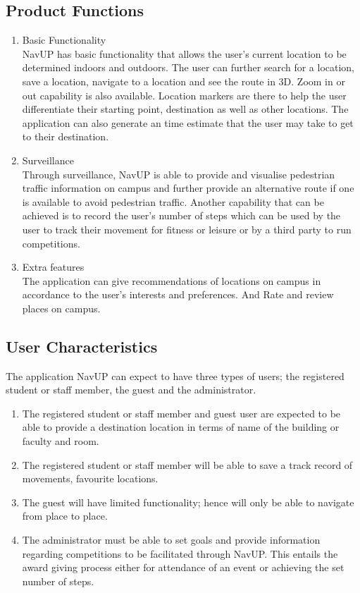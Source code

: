 \documentclass[a4paper,10pt]{article}
\begin{document}
	\subsection{Product Functions}
		\begin{enumerate}
			\item Basic Functionality\\
			NavUP has basic functionality that allows the user's current location to be determined indoors and outdoors. The user can further search for a location, save a location, navigate to a location and see the route in 3D. Zoom in or out capability is also available. Location markers  are there to help the user differentiate their starting point, destination as well as other locations. The application can also generate an time estimate that the user may take to get to their destination.
			
			\item Surveillance\\
			Through surveillance, NavUP is able to provide and visualise pedestrian traffic information on campus and further provide an alternative route if one is available to avoid pedestrian traffic. Another capability that can be achieved is to record the user's number of steps which can be used by the user to track their movement for fitness or leisure or by a third party to run competitions.
			
			\item Extra features\\
			The application can give recommendations of locations on campus in accordance to the user's interests and preferences. And Rate and review places on campus.
		\end{enumerate}				
					
	\subsection{User Characteristics}
		The application NavUP can expect to have three types of users; the registered student or staff member, the guest and the administrator.
		\begin{enumerate}
		\item The registered student or staff member and guest user are expected to be able to provide a destination location in terms of name of the building or faculty and room.
		
		\item The registered student or staff member will be able to save a track record of movements, favourite locations.
		
		\item The guest will have limited functionality; hence will only be able to navigate from place to place.
		
		\item The administrator must be able to set goals and provide information regarding competitions to be facilitated through NavUP. This entails the award giving process either for attendance of an event or achieving the set number of steps.
		\end{enumerate}
\end{document}
